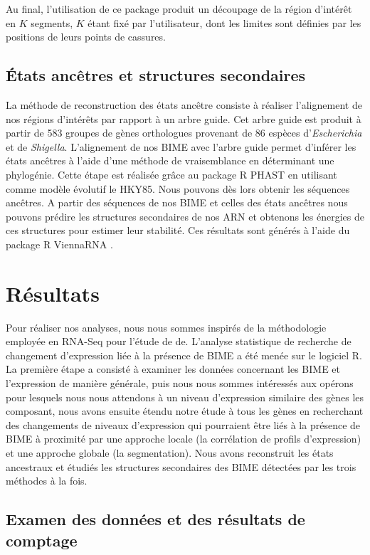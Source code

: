\documentclass[12pt,a4paper]{report}
\begin{document}
\begin{onehalfspace}
Au final, l'utilisation de ce package produit un découpage de la région d'intérêt en $K$ segments, $K$ étant fixé par l'utilisateur, dont les limites sont définies par les positions de leurs points de cassures.

\section*{États ancêtres et structures secondaires}
La méthode de reconstruction des états ancêtre consiste à réaliser l'alignement de nos régions d'intérêts par rapport à un arbre guide. Cet arbre guide est produit à partir de 583 groupes de gènes orthologues provenant de 86 espèces d'\textit{Escherichia} et de \textit{Shigella}. L'alignement de nos BIME avec l'arbre guide permet d'inférer les états ancêtres à l'aide d'une méthode de vraisemblance en déterminant une phylogénie. Cette étape est réalisée grâce au package R PHAST \citep{Hubisz2011} en utilisant comme modèle évolutif le HKY85. Nous pouvons dès lors obtenir les séquences ancêtres. A partir des séquences de nos BIME et celles des états ancêtres nous pouvons prédire les structures secondaires de nos ARN et obtenons les énergies de ces structures pour estimer leur stabilité. Ces résultats sont générés à l'aide du package R ViennaRNA \citep{Lorenz2011}.

\chapter*{Résultats}

Pour réaliser nos analyses, nous nous sommes inspirés de la méthodologie employée en RNA-Seq pour l'étude de \gls{de}. L'analyse statistique de recherche de changement d'expression liée à la présence de BIME a été menée sur le logiciel R. La première étape a consisté à examiner les données concernant les BIME et l'expression de manière générale, puis nous nous sommes intéressés aux opérons pour lesquels nous nous attendons à un niveau d'expression similaire des gènes les composant, nous avons ensuite étendu notre étude à tous les gènes en recherchant des changements de niveaux d'expression qui pourraient être liés à la présence de BIME à proximité par une approche locale (la corrélation de profils d'expression) et une approche globale (la segmentation). Nous avons reconstruit les états ancestraux et étudiés les structures secondaires des BIME détectées par les trois méthodes à la fois.

\section*{Examen des données et des résultats de comptage}


\end{onehalfspace}
\end{document}
